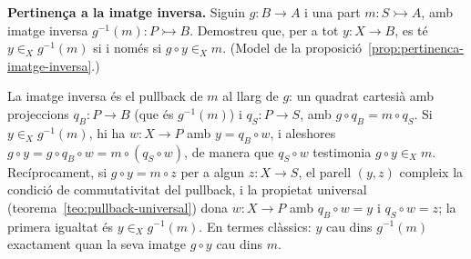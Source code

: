 \begin{exercici}
\textbf{Pertinença a la imatge inversa.} Siguin \(g:B\to A\) i una part \(m:S\rightarrowtail A\), amb imatge inversa \(g^{-1}(m):P\rightarrowtail B\). Demostreu que, per a tot \(y:X\to B\), es té \(y\in_X g^{-1}(m)\) si i només si \(g\circ y\in_X m\). (Model de la proposició~\ref{prop:pertinenca-imatge-inversa}.)
\end{exercici}
\begin{solucio}
La imatge inversa és el pullback de \(m\) al llarg de \(g\): un quadrat cartesià amb projeccions \(q_B\colon P\to B\) (que és \(g^{-1}(m)\)) i \(q_S\colon P\to S\), amb \(g\circ q_B=m\circ q_S\). Si \(y\in_X g^{-1}(m)\), hi ha \(w\colon X\to P\) amb \(y=q_B\circ w\), i aleshores \(g\circ y=g\circ q_B\circ w=m\circ(q_S\circ w)\), de manera que \(q_S\circ w\) testimonia \(g\circ y\in_X m\). Recíprocament, si \(g\circ y=m\circ z\) per a algun \(z\colon X\to S\), el parell \((y,z)\) compleix la condició de commutativitat del pullback, i la propietat universal (teorema~\ref{teo:pullback-universal}) dona \(w\colon X\to P\) amb \(q_B\circ w=y\) i \(q_S\circ w=z\); la primera igualtat és \(y\in_X g^{-1}(m)\). En termes clàssics: \(y\) cau dins \(g^{-1}(m)\) exactament quan la seva imatge \(g\circ y\) cau dins \(m\).
\end{solucio}
